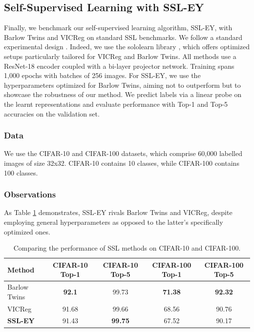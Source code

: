 \subsection{Self-Supervised Learning with SSL-EY}
Finally, we benchmark our self-supervised learning algorithm, SSL-EY, with Barlow Twins and VICReg on standard SSL benchmarks.
We follow a standard experimental design \citep{tong2023emp}.
Indeed, we use the sololearn library \citep{da2022solo}, which offers optimized setups particularly tailored for VICReg and Barlow Twins.
All methods use a ResNet-18 encoder coupled with a bi-layer projector network.
Training spans 1,000 epochs with batches of 256 images.
For SSL-EY, we use the hyperparameters optimized for Barlow Twins, aiming not to outperform but to showcase the robustness of our method.
We predict labels via a linear probe on the learnt representations and evaluate performance with Top-1 and Top-5 accuracies on the validation set.

\subsubsection{Data} We use the CIFAR-10 and CIFAR-100 datasets, which comprise 60,000 labelled images of size 32x32.
CIFAR-10 contains 10 classes, while CIFAR-100 contains 100 classes.

\subsubsection{Observations} As Table \ref{tab:selfsup} demonstrates, SSL-EY rivals Barlow Twins and VICReg, despite employing general hyperparameters as opposed to the latter's specifically optimized ones.

\begin{table}[H]
    \centering
    \begin{tabular}{|l|c|c|c|c|}
        \hline
        Method          & CIFAR-10 Top-1 & CIFAR-10 Top-5 & CIFAR-100 Top-1 & CIFAR-100 Top-5 \\
        \hline
        Barlow Twins    & \textbf{92.1}  & 99.73          & \textbf{71.38}  & \textbf{92.32}  \\
        \hline
        VICReg          & 91.68          & 99.66          & 68.56           & 90.76           \\
        \hline
        \textbf{SSL-EY} & 91.43          & \textbf{99.75} & 67.52           & 90.17           \\
        \hline
    \end{tabular}
    \caption{Comparing the performance of SSL methods on CIFAR-10 and CIFAR-100.}
    \label{tab:selfsup}
\end{table}

